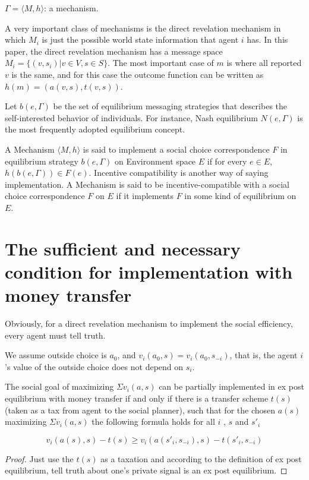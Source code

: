 $\Gamma=\langle M, h\rangle$: a mechanism.

A very important class of mechanisms is the direct revelation mechanism in which $M_i$ is just the possible world state information 
that agent $i$ has. In this paper, the direct revelation mechanism has a message space $M_i=\{(v, s_i)|v\in V, s \in S \}$. The most
important case of $m$ is where all reported $v$ is the same, and for this case the outcome function can be written as 
$h(m)=(a(v,s),t(v,s))$.

Let $b(e, \Gamma)$ be the set of equilibrium messaging strategies that describes the self-interested behavior of individuals.
For instance, Nash equilibrium $N(e,\Gamma)$ is the most frequently adopted equilibrium concept.

A Mechanism $\langle M, h\rangle$ is said to implement a social choice correspondence $F$ in equilibrium strategy 
$b(e, \Gamma)$ on Environment space $E$ if for every $e\in E$, $h(b(e,\Gamma))\in F(e)$.
Incentive compatibility is another way of saying implementation. A Mechanism is said to be incentive-compatible with a social choice
correspondence $F$ on $E$ if it implements $F$ in some kind of equilibrium on $E$. 








\section{The sufficient and necessary condition for implementation with money transfer}



Obviously, for a direct revelation mechanism to implement the social efficiency, every agent must tell truth. 


We assume outside choice is $a_0$, and $v_i(a_0,s)=v_i(a_0,s_{-i})$, that is, the agent $i$'s value of the outside choice does not
depend on $s_i$.
\begin{thm} \label{thm}
The social goal of maximizing $\Sigma v_i(a, s)$ can be partially implemented in ex post equilibrium with money transfer if and only if there is a transfer scheme $t(s)$(taken as a tax from agent to the social planner), such that for 
the chosen $a(s)$ maximizing $\Sigma v_i(a, s)$ the following formula holds for all $i$ , $s$ and $s'_i$

\[v_i(a(s), s) - t(s) \geq v_i(a(s'_i, s_{-i}), s) - t(s'_i, s_{-i}) \]
\end{thm}
\begin{proof}
Just use the $t(s)$ as a taxation and according to the definition of ex post equilibrium,  tell truth about one's private signal is an ex post equilibrium.

\end{proof}

